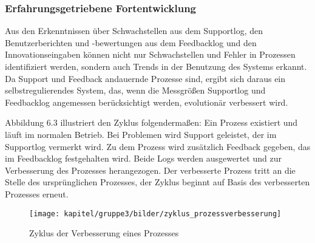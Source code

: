 \subsubsection{Erfahrungsgetriebene Fortentwicklung}
Aus den Erkenntnissen über Schwachstellen aus dem Supportlog, den Benutzerberichten und -bewertungen aus dem Feedbacklog und den Innovationseingaben können nicht nur Schwachstellen und Fehler in Prozessen identifiziert werden, sondern auch Trends in der Benutzung des Systems erkannt. Da Support und Feedback andauernde Prozesse sind, ergibt sich daraus ein selbstregulierendes System, das, wenn die Messgrößen Supportlog und Feedbacklog angemessen berücksichtigt werden, evolutionär verbessert wird.

Abbildung 6.3 illustriert den Zyklus folgendermaßen: Ein Prozess existiert und läuft im normalen Betrieb. Bei Problemen wird Support geleistet, der im Supportlog vermerkt wird. Zu dem Prozess wird zusätzlich Feedback gegeben, das im Feedbacklog festgehalten wird. Beide Logs werden ausgewertet und zur Verbesserung des Prozesses herangezogen. Der verbesserte Prozess tritt an die Stelle des ursprünglichen Prozesses, der Zyklus beginnt auf Basis des verbesserten Prozesses erneut.

\begin{figure}[h!]
	\centering
	\texttt{[image: kapitel/gruppe3/bilder/zyklus\_prozessverbesserung]}
	\caption{Zyklus der Verbesserung eines Prozesses}
	\label{fig_zyklus_prozessverbesserung}
\end{figure}





















